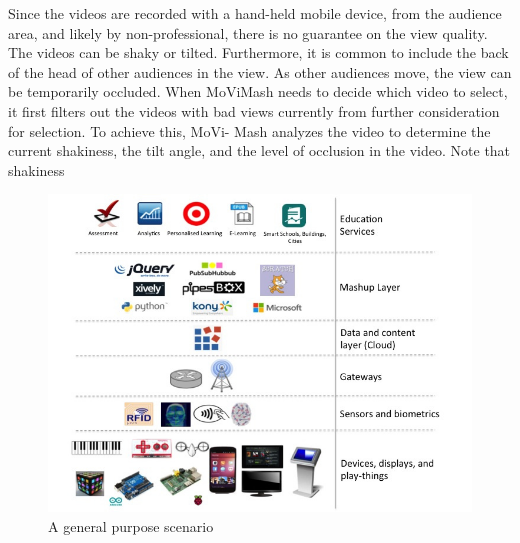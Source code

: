 \documentclass{sig-alternate}
\begin{document}
Since the videos are recorded with a hand-held mobile device,
from the audience area, and likely by non-professional, there is no
guarantee on the view quality. The videos can be shaky or tilted.
Furthermore, it is common to include the back of the head of other
audiences in the view. As other audiences move, the view can be
temporarily occluded. When MoViMash needs to decide which
video to select, it first filters out the videos with bad views currently
from further consideration for selection. To achieve this, MoVi-
Mash analyzes the video to determine the current shakiness, the tilt
angle, and the level of occlusion in the video. Note that shakiness 


\begin{figure}[h!]
  \includegraphics[width= \linewidth]{general.jpg}
  \caption{A general purpose scenario}
  \label{fig:fig 1}
\end{figure}
\end{document}
